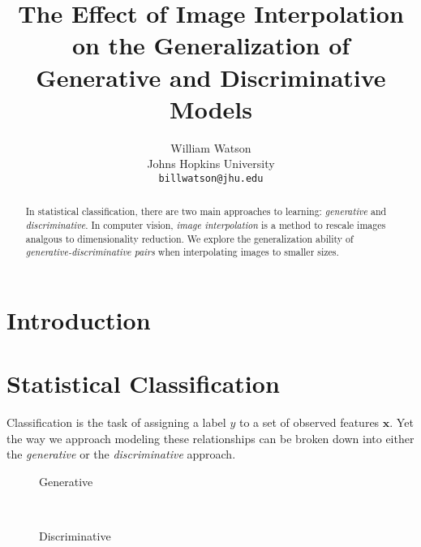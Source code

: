 \documentclass{article}
\title{The Effect of Image Interpolation on the Generalization of Generative and Discriminative Models}
\author{%
  William Watson \\
  Johns Hopkins University\\
  \texttt{billwatson@jhu.edu} \\
}
\begin{document}

\maketitle

\begin{abstract}
  In statistical classification, there are two main approaches to learning:
  \textit{generative} and \textit{discriminative}. In computer vision,
  \textit{image interpolation} is a method to rescale images analgous to
  dimensionality reduction. We explore the generalization ability of
  \textit{generative-discriminative pairs} when interpolating images to smaller
  sizes.
\end{abstract}



\section{Introduction}
\label{sec:intro}


\section{Statistical Classification}
Classification is the task of assigning a label $y$ to a set of observed
features $\mathbf{x}$. Yet the way we approach modeling these relationships
can be broken down into either the \textit{generative} or the
\textit{discriminative} approach.

\begin{figure*}[h!]
    \centering
    \begin{subfigure}[t]{0.15\textwidth}
        \centering
        \caption*{Generative}
    \end{subfigure}%
    ~
    \begin{subfigure}[t]{0.15\textwidth}
        \centering
        \caption*{Discriminative}
    \end{subfigure}
\end{figure*}
\end{document}
